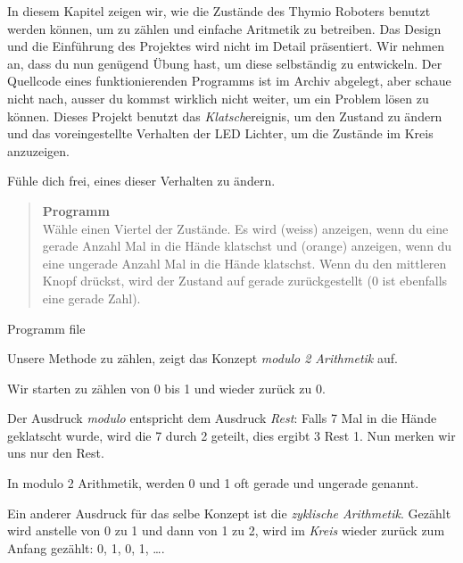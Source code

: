 
\label{ch.counting}

In diesem Kapitel zeigen wir, wie die Zustände des Thymio Roboters benutzt werden können, um zu zählen und einfache Aritmetik zu betreiben.
Das Design und die Einführung des Projektes wird nicht im Detail präsentiert. Wir nehmen an, dass du nun genügend Übung hast, um diese selbständig zu entwickeln. Der Quellcode eines funktionierenden Programms ist im Archiv abgelegt, aber schaue nicht nach, ausser du kommst wirklich nicht weiter, um ein Problem lösen zu können.
Dieses Projekt benutzt das \emph{Klatsch}ereignis, um den Zustand zu ändern und 
das voreingestellte Verhalten der LED Lichter, um die Zustände im Kreis anzuzeigen. 



Fühle dich frei, eines dieser Verhalten zu ändern.



\begin{quote}
\textbf{Programm}\\Wähle einen Viertel der Zustände. Es wird  (weiss) anzeigen, wenn du eine gerade Anzahl Mal in die Hände klatschst und  (orange) anzeigen, wenn du eine ungerade Anzahl Mal in die Hände klatschst. 
Wenn du den mittleren Knopf drückst, wird der Zustand auf gerade zurückgestellt (0 ist ebenfalls eine gerade Zahl).
\end{quote}

{\raggedleft \hfill Programm file }

Unsere Methode zu zählen, zeigt das Konzept \emph{modulo 2 Arithmetik} auf.

Wir starten zu zählen von 0 bis 1 und wieder zurück zu 0.

Der Ausdruck \emph{modulo} entspricht dem Ausdruck \emph{Rest}: Falls 7 Mal in die Hände geklatscht wurde, wird die 7 durch 2 geteilt, dies ergibt 3 Rest 1. Nun merken wir uns nur den Rest.

In modulo 2 Arithmetik, werden 0 und 1 oft gerade und ungerade genannt.

Ein anderer Ausdruck für das selbe Konzept ist die \emph{zyklische Arithmetik}. Gezählt wird anstelle von 0 zu 1 und dann von 1 zu 2, wird im \emph{Kreis} wieder zurück zum Anfang gezählt: 0, 1, 0, 1, \ldots.

